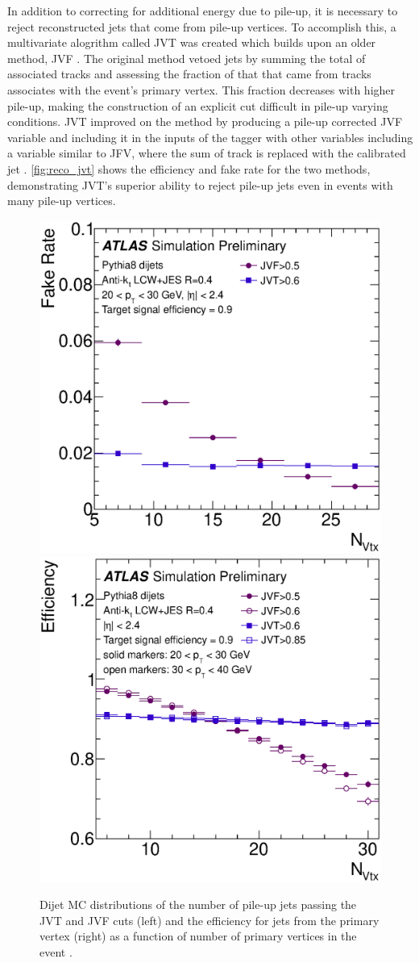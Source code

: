 In addition to correcting for additional energy due to pile-up, it is necessary to reject reconstructed jets that come from pile-up vertices. To accomplish this, a multivariate alogrithm called \ac{JVT} was created which builds upon an older method, \ac{JVF} \cite{ATLAS-CONF-2014-018}. The original method vetoed jets by summing the total \pt of associated tracks and assessing the fraction of that \pt that came from tracks associates with the event's primary vertex. This fraction decreases with higher pile-up, making the construction of an explicit cut difficult in pile-up varying conditions. \ac{JVT} improved on the method by producing a pile-up corrected \ac{JVF} variable and including it in the inputs of the tagger with other variables including a variable similar to \ac{JFV}, where the sum of track \pt is replaced with the calibrated jet \pt. \autoref{fig:reco_jvt} shows the efficiency and fake rate for the two methods, demonstrating \ac{JVT}'s superior ability to reject pile-up jets even in events with many pile-up vertices.

\begin{centering}
\begin{figure}[!hbt]
\myfloatalign
\includegraphics[width=.48\linewidth]{figures/reco/jvt_fig_06b.eps}
\includegraphics[width=.48\linewidth]{figures/reco/jvt_fig_07a.eps}
\caption{ Dijet \ac{MC} distributions of the number of pile-up jets passing the \ac{JVT} and \ac{JVF} cuts (left) and the efficiency for jets from the primary vertex (right) as a function of number of primary vertices in the event \cite{ATLAS-CONF-2014-018}. }
\label{fig:reco_jvt}
\end{figure}
\end{centering}

